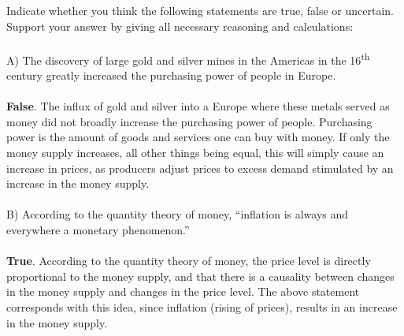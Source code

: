 \begin{homeworkProblem}[2]
    Indicate whether you think the following statements are true, false or 
    uncertain. Support your answer by giving all necessary reasoning and 
    calculations:
    \\ \\
    A) The discovery of large gold and silver mines in the Americas in the
    16\textsuperscript{th} century greatly increased the purchasing power
    of people in Europe.
    \\ \\
    \textbf{False}. The influx of gold and silver into a Europe where these 
    metals served as money did not broadly increase the purchasing power of 
    people. Purchasing power is the amount of goods and services one can buy
    with money. If only the money supply increases, all other things being 
    equal, this will simply cause an increase in prices, as producers adjust 
    prices to excess demand stimulated by an increase in the money supply.
    \\ \\
    
    B) According to the quantity theory of money, ``inflation is always
    and everywhere a monetary phenomenon.''
    \\ \\
    \textbf{True}. According to the quantity theory of money, the price
    level is directly proportional to the money supply, and that there is a 
    causality between changes in the money supply and changes in the price 
    level. The above statement corresponds with this idea, since inflation 
    (rising of prices), results in an increase in the money supply. 
    
\end{homeworkProblem}